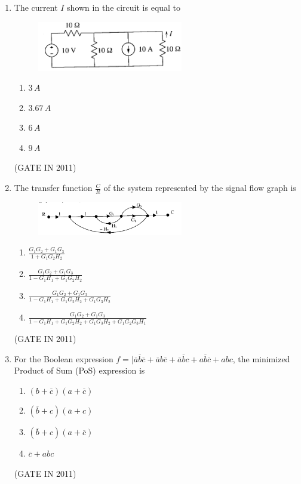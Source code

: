\documentclass[journal]{IEEEtran}
\begin{document}
\begin{enumerate}
\item The current $ I $ shown in the circuit is equal to
\begin{figure}[H]
    \centering
      \includegraphics[width=0.6\textwidth]{6.png} 
      \caption{}
    \label{fig:fig6} 
\end{figure}
\begin{multicols}{4}
\begin{enumerate}
\item $3\,A$  
\item $3.67\,A$  
\item $6\,A$  
\item $9\,A$
\end{enumerate}
\end{multicols} \hfill(GATE IN 2011)

\item The transfer function $ \frac{C}{R} $ of the system represented by the signal flow graph is
\begin{figure}[H]
    \centering
      \includegraphics[width=0.6\textwidth]{7.png} 
      \caption{}
    \label{fig:fig7} 
\end{figure}
\begin{enumerate}
\item $ \frac{G_1G_2 + G_1G_3}{1 + G_1G_2H_2} $  
\item $ \frac{G_1G_2 + G_1G_3}{1 - G_1H_1 + G_1G_2H_2} $  
\item $ \frac{G_1G_2 + G_1G_3}{1 - G_1H_1 + G_1G_2H_2 + G_1G_3H_2} $  
\item $ \frac{G_1G_2 + G_1G_3}{1 - G_1H_1 + G_1G_2H_2 + G_1G_3H_2 + G_1G_2G_3H_1} $
\end{enumerate}
\hfill(GATE IN 2011)
\item For the Boolean expression $ f = |\overline{a}\overline{b}\overline{c} + \overline{a}b\overline{c} + \overline{a}\overline{b}c + a\overline{b}\overline{c} + abc $, the minimized Product of Sum (PoS) expression is
\begin{enumerate}
\item $ (b + \overline{c})(a + \overline{c}) $  
\item $ (\overline{b} + c)(\overline{a} + c) $  
\item $ (\overline{b} + c)(a + \overline{c}) $  
\item $ \overline{c} + abc $
\end{enumerate}
\hfill(GATE IN 2011)


\end{enumerate}
\end{document}
